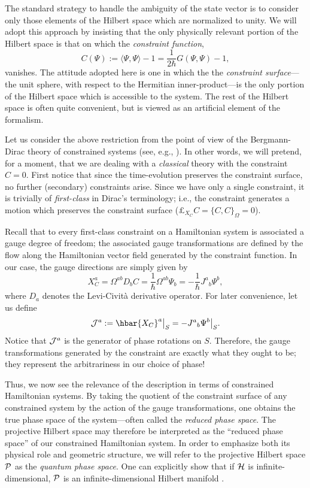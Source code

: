 \documentclass[12pt,aps,eqsecnum,tighten,nofootinbib]{revtex4-2}
\def\be{\begin{equation}}
\def\ee{\end{equation}}
\def\<{\langle}
\def\>{\rangle}
\def\H{{\cal H}}
\def\P{{\cal P}}
\def\W{\Omega}
\def\J{{\cal J}}
\newcommand{\lie}[1]{{\pounds}_{#1}}
\newcommand{\hvf}[1]{{X_{#1}}}
\begin{document}
The standard strategy to handle the ambiguity of the state vector is
to consider only those elements of the Hilbert space which are
normalized to unity. We will adopt this approach by insisting that the
only physically relevant portion of the Hilbert space is that on which
the {\em constraint function},
%
\be \label{constraint}
C(\Psi) := \< \Psi, \Psi \> -1
= \frac{1}{2\hbar} G( \Psi, \Psi ) - 1,
\ee
%
vanishes.  The attitude adopted here is one in which the the {\em
constraint surface}---the unit sphere, with respect to the Hermitian
inner-product---is the only portion of the Hilbert space which is
accessible to the system.  The rest of the Hilbert space is often
quite convenient, but is viewed as an artificial element of the
formalism.

Let us consider the above restriction from the point of view of the
Bergmann-Dirac theory of constrained systems (see, e.g.,
\cite{bd}). In other words, we will pretend, for a moment, that we are
dealing with a {\em classical} theory with the constraint $C=0$.  First
notice that since the time-evolution preserves the constraint surface,
no further (secondary) constraints arise.  Since we have only
a single constraint, it is trivially of {\em first-class} in Dirac's
terminology; i.e., the constraint generates a motion which preserves
the constraint surface ($\lie{\hvf{C}} C = \{ C, C\}_\W = 0$).

Recall that to every first-class constraint on a Hamiltonian system is
associated a gauge degree of freedom; the associated gauge
transformations are defined by the flow along the Hamiltonian vector
field generated by the constraint function.  In our case, the gauge
directions are simply given by
% 
\be X^a_{C} = \W^{ab} D_b C =
\frac{1}{\hbar}\W^{ab} \Psi_b
		  = - \frac{1}{\hbar} J^a{}_b \Psi^b,
\ee
%
where $D_a$ denotes the Levi-Civit\`a derivative operator.  For later
convenience, let us define
%
\be
	\J^a := \hbar \hvf{C}^a\big|_S = - J^a{}_b \Psi^b\big|_S.
\ee
%
Notice that $\J^a$ is the generator of phase rotations on $S$.
Therefore, the gauge transformations generated by the constraint are
exactly what they ought to be; they represent the arbitrariness in our
choice of phase!

Thus, we now see the relevance of the description in terms of
constrained Hamiltonian systems.  By taking the quotient of the
constraint surface of any constrained system by the action of the
gauge transformations, one obtains the true phase space of the
system---often called the {\em reduced phase space}.  The projective
Hilbert space may therefore be interpreted as the ``reduced phase
space'' of our constrained Hamiltonian system.  In order to emphasize
both its physical role and geometric structure, we will refer to the
projective Hilbert space $\P$ as the {\em quantum phase space}. One
can explicitly show that if $\H$ is infinite-dimensional, $\P$ is an
infinite-dimensional Hilbert manifold \cite{thesis}.
\end{document}
